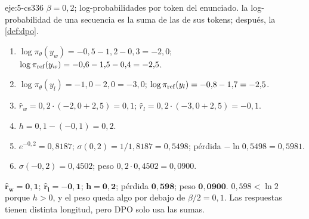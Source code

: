 \begin{solucion}{eje:5-cs336}
\datos $\beta=0{,}2$; log-probabilidades por token del enunciado.
\planteamiento la log-probabilidad de una secuencia es la suma de las de sus tokens; después, la \cref{def:dpo}.
\pasos
\begin{enumerate}[label=\arabic*.]
  \item $\log\pi_\theta(y_w)=-0{,}5-1{,}2-0{,}3=-2{,}0$; $\log\pi_{\mathrm{ref}}(y_w)=-0{,}6-1{,}5-0{,}4=-2{,}5$.
  \item $\log\pi_\theta(y_l)=-1{,}0-2{,}0=-3{,}0$; $\log\pi_{\mathrm{ref}}(y_l)=-0{,}8-1{,}7=-2{,}5$.
  \item $\hat r_w=0{,}2\cdot(-2{,}0+2{,}5)=0{,}1$; $\hat r_l=0{,}2\cdot(-3{,}0+2{,}5)=-0{,}1$.
  \item $h=0{,}1-(-0{,}1)=0{,}2$.
  \item $e^{-0{,}2}=0{,}8187$; $\sigma(0{,}2)=1/1{,}8187=0{,}5498$; pérdida $-\ln 0{,}5498=0{,}5981$.
  \item $\sigma(-0{,}2)=0{,}4502$; peso $0{,}2\cdot 0{,}4502=0{,}0900$.
\end{enumerate}
\resultado $\mathbf{\hat r_w=0{,}1}$; $\mathbf{\hat r_l=-0{,}1}$; $\mathbf{h=0{,}2}$; pérdida $\mathbf{0{,}598}$; peso $\mathbf{0{,}0900}$.
\comprobacion $0{,}598<\ln 2$ porque $h>0$, y el peso queda algo por debajo de $\beta/2=0{,}1$. Las respuestas tienen distinta longitud, pero DPO solo usa las sumas.
\end{solucion}

